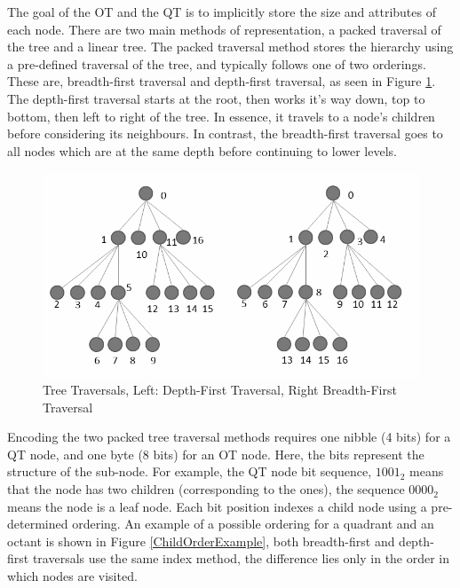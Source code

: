 The goal of the OT and the QT is to implicitly store the size and attributes of each node. There are two main methods of representation, a packed traversal of the tree and a linear tree. The packed traversal method stores the hierarchy using a pre-defined traversal of the tree, and typically follows one of two orderings. These are, breadth-first traversal and depth-first traversal, as seen in Figure \ref{TreeTraversalExample}. The depth-first traversal starts at the root, then works it's way down, top to bottom, then left to right of the tree. In essence, it travels to a node's children before considering its neighbours. In contrast, the breadth-first traversal goes to all nodes which are at the same depth before continuing to lower levels. \\


\begin{figure}[t]
\centering
\includegraphics[width=12cm]{images/ch2/TreeTraversalExample}
\caption{Tree Traversals, Left: Depth-First Traversal, Right Breadth-First Traversal}
\label{TreeTraversalExample}
\end{figure}

Encoding the two packed tree traversal methods requires one nibble (4 bits) for a QT node, and one byte (8 bits) for an OT node. Here, the bits represent the structure of the sub-node. For example, the QT node bit sequence, $1001_2$ means that the node has two children (corresponding to the ones), the sequence $0000_2$ means the node is a leaf node. Each bit position indexes a child node using a pre-determined ordering. An example of a possible ordering for a quadrant and an octant is shown in Figure \ref{ChildOrderExample}, both breadth-first and depth-first traversals use the same index method, the difference lies only in the order in which nodes are visited. 


